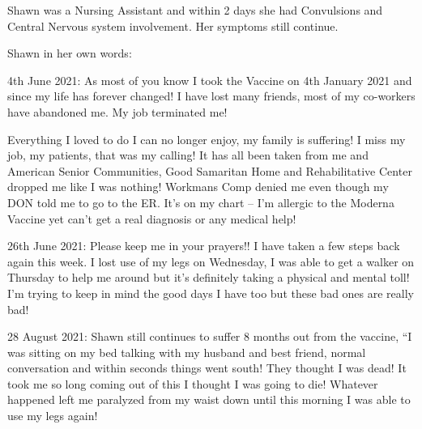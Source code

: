 Shawn was a Nursing Assistant and within 2 days she had Convulsions and Central
Nervous system involvement. Her symptoms still continue.

Shawn in her own words:

4th June 2021: As most of you know I took the Vaccine on 4th January 2021 and
since my life has forever changed! I have lost many friends, most of my
co-workers have abandoned me. My job terminated me!

Everything I loved to do I can no longer enjoy, my family is suffering! I miss
my job, my patients, that was my calling! It has all been taken from me and
American Senior Communities, Good Samaritan Home and Rehabilitative Center
dropped me like I was nothing! Workmans Comp denied me even though my DON told
me to go to the ER. It’s on my chart – I’m allergic to the Moderna Vaccine yet
can’t get a real diagnosis or any medical help!

26th June 2021: Please keep me in your prayers!! I have taken a few steps back
again this week. I lost use of my legs on Wednesday, I was able to get a walker
on Thursday to help me around but it’s definitely taking a physical and mental
toll! I’m trying to keep in mind the good days I have too but these bad ones are
really bad!

28 August 2021: Shawn still continues to suffer 8 months out from the vaccine,
“I was sitting on my bed talking with my husband and best friend, normal
conversation and within seconds things went south! They thought I was dead! It
took me so long coming out of this I thought I was going to die! Whatever
happened left me paralyzed from my waist down until this morning I was able to
use my legs again!

